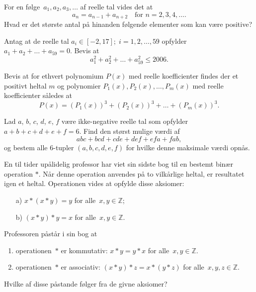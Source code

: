 \documentclass{bw06}
\begin{document}
\maketitle

\begin{problems}

\item
  For en f\o lge~$a_1, a_2, a_3, \dots$ af reelle tal vides det at
  \[a_n=a_{n-1}+a_{n+2} \quad \text{for } n=2,3,4,\dots.\]
  Hvad er det st\o rste antal p\aa{} hinanden f\o lgende elementer 
som kan v\ae re positive?

\item
  Antag at de reelle tal
$a_i\in[-2, 17];\; i = 1, 2, \dots, 59$
opfylder $a_1+a_2+\dots+a_{59}=0$.
Bevis at
\[a_1^2 + a_2^2 + \dots + a_{59}^2 \le 2006.\]

\item
Bevis at for ethvert polynomium $P(x)$ med reelle koefficienter findes 
der et positivt heltal $m$ og polynomier
$P_1(x), P_2(x), \ldots, P_m(x)$ med reelle koefficienter
s\aa ledes at
\[P(x)=(P_1(x))^3+(P_2(x))^3+\dots+(P_m(x))^3.\]

\item
Lad $a$, $b$, $c$, $d$, $e$, $f$ v\ae re ikke-negative reelle
tal som opfylder $a+b+c+d+e+f=6$. Find den st\o rst mulige v\ae rdi af
\[abc+bcd+cde+def+efa+fab,\] og bestem alle $6$-tupler
$(a,b,c,d,e,f)$ for hvilke denne maksimale v\ae rdi opn\aa s.

\item En til tider up\aa lidelig professor har viet sin sidste bog
til en bestemt bin\ae r operation $*$. N\aa r denne operation anvendes
 p\aa{} to vilk\aa rlige heltal, er resultatet igen et heltal. Operationen
 vides at opfylde disse aksiomer:
  \begin{itemize}
    \item[a) ] $x*(x*y)=y$ for alle~$x,y \in \mathbb{Z}$;
    \item[b) ] $(x*y)*y=x$ for alle~$x,y \in \mathbb{Z}$.
  \end{itemize}
Professoren p\aa st\aa r i sin bog at
  \begin{enumerate}
  \item operationen~$*$ er kommutativ:
    $x*y=y*x$ for alle~$x,y \in \mathbb{Z}$.
  \item operationen~$*$ er associativ:
    $(x*y)*z=x*(y*z)$ for alle~$x,y,z \in \mathbb{Z}$.
  \end{enumerate}
Hvilke af disse p\aa stande f\o lger fra de givne aksiomer?


\end{problems}
\end{document}
